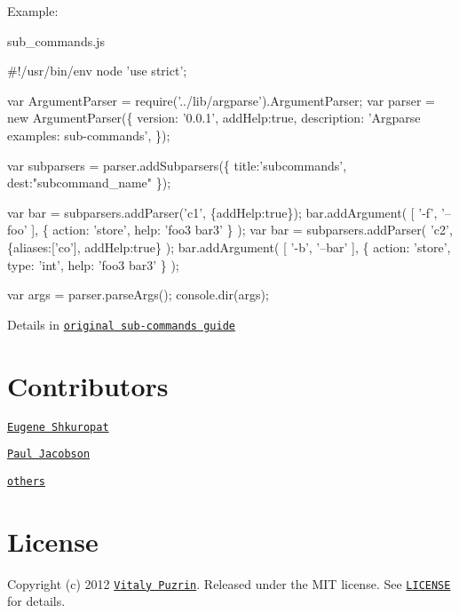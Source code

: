 Example\+:

sub\+\_\+commands.\+js 
\begin{DoxyCode}
#!/usr/bin/env node
'use strict';

var ArgumentParser = require('../lib/argparse').ArgumentParser;
var parser = new ArgumentParser(\{
  version: '0.0.1',
  addHelp:true,
  description: 'Argparse examples: sub-commands',
\});

var subparsers = parser.addSubparsers(\{
  title:'subcommands',
  dest:"subcommand\_name"
\});

var bar = subparsers.addParser('c1', \{addHelp:true\});
bar.addArgument(
  [ '-f', '--foo' ],
  \{
    action: 'store',
    help: 'foo3 bar3'
  \}
);
var bar = subparsers.addParser(
  'c2',
  \{aliases:['co'], addHelp:true\}
);
bar.addArgument(
  [ '-b', '--bar' ],
  \{
    action: 'store',
    type: 'int',
    help: 'foo3 bar3'
  \}
);

var args = parser.parseArgs();
console.dir(args);
\end{DoxyCode}


Details in \href{http://docs.python.org/dev/library/argparse.html#sub-commands}{\tt original sub-\/commands guide}

\section*{Contributors }


\begin{DoxyItemize}
\item \href{https://github.com/shkuropat}{\tt Eugene Shkuropat}
\item \href{https://github.com/hpaulj}{\tt Paul Jacobson}
\end{DoxyItemize}

\href{https://github.com/nodeca/argparse/graphs/contributors}{\tt others}

\section*{License }

Copyright (c) 2012 \href{https://github.com/puzrin}{\tt Vitaly Puzrin}. Released under the M\+IT license. See \href{https://github.com/nodeca/argparse/blob/master/LICENSE}{\tt L\+I\+C\+E\+N\+SE} for details. 